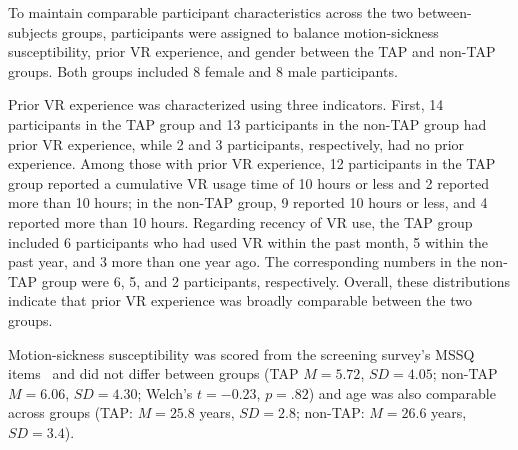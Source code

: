 

To maintain comparable participant characteristics across the two between-subjects groups, participants were assigned to balance motion-sickness susceptibility, prior VR experience, and gender between the TAP and non-TAP groups. Both groups included 8 female and 8 male participants.

Prior VR experience was characterized using three indicators. First, 14 participants in the TAP group and 13 participants in the non-TAP group had prior VR experience, while 2 and 3 participants, respectively, had no prior experience. Among those with prior VR experience, 12 participants in the TAP group reported a cumulative VR usage time of 10 hours or less and 2 reported more than 10 hours; in the non-TAP group, 9 reported 10 hours or less, and 4 reported more than 10 hours. Regarding recency of VR use, the TAP group included 6 participants who had used VR within the past month, 5 within the past year, and 3 more than one year ago. The corresponding numbers in the non-TAP group were 6, 5, and 2 participants, respectively.
Overall, these distributions indicate that prior VR experience was broadly comparable between the two groups.

Motion-sickness susceptibility was scored from the screening survey's MSSQ items~\cite{golding1998mssq} and did not differ between groups (TAP $M=5.72$, $SD=4.05$; non-TAP $M=6.06$, $SD=4.30$; Welch's $t=-0.23$, $p=.82$) and age was also comparable across groups (TAP: $M=25.8$ years, $SD=2.8$; non-TAP: $M=26.6$ years, $SD=3.4$).



